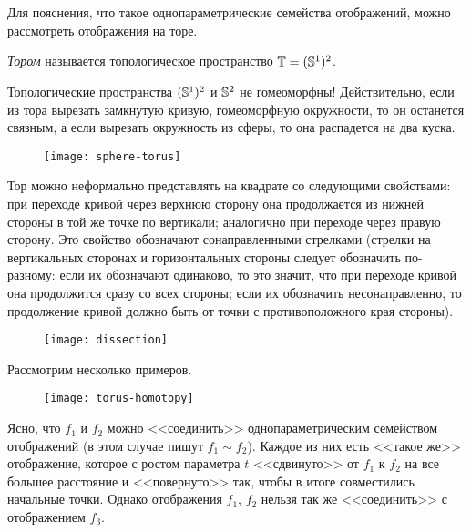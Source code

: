 \documentclass[main]{subfiles}
\begin{document}
\resetcounters

\section{}

Для пояснения, что такое однопараметрические семейства отображений, можно рассмотреть отображения на торе.

\begin{definition}
	\emph{Тором} называется топологическое пространство $ \T = (\S^1)^2 $.
\end{definition}

\begin{remark}
	Топологические пространства $ (\S^1)^2 $ и $ \S^2 $ не гомеоморфны! Действительно, если из тора вырезать замкнутую
	кривую, гомеоморфную окружности, то он останется связным, а если вырезать окружность из сферы, то она распадется
	на два куска.
\end{remark}

\begin{figure}[h]
	\centering \texttt{[image: sphere-torus]}
\end{figure}

Тор можно неформально представлять на квадрате со следующими свойствами: при переходе кривой через верхнюю сторону она
продолжается из нижней стороны в той же точке по вертикали; аналогично при переходе через правую сторону. Это свойство
обозначают сонаправленными стрелками (стрелки на вертикальных сторонах и горизонтальных стороны следует обозначить
по-разному: если их обозначают одинаково, то это значит, что при переходе кривой она продолжится сразу со всех стороны;
если их обозначить несонаправленно, то продолжение кривой должно быть от точки с противоположного края стороны).

\begin{figure}[h]
	\centering \texttt{[image: dissection]}
\end{figure}

Рассмотрим несколько примеров.

\begin{figure}[h]
	\centering \texttt{[image: torus-homotopy]}
\end{figure}

Ясно, что $ f_1 $ и $ f_2 $ можно <<соединить>> однопараметрическим семейством отображений (в этом случае пишут
$ f_1 \sim f_2 $). Каждое из них есть <<такое же>> отображение, которое с ростом параметра $ t $ <<сдвинуто>> от
$ f_1 $ к $ f_2 $ на все большее расстояние и <<повернуто>> так, чтобы в итоге совместились начальные точки.
Однако отображения $ f_1 $, $ f_2 $ нельзя так же <<соединить>> с отображением $ f_3 $.
\end{document}
